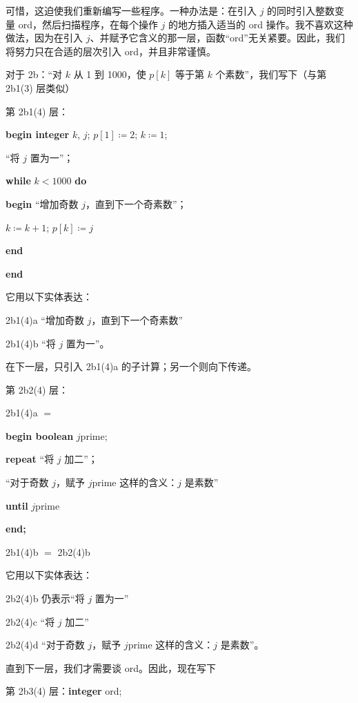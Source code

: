 可惜，这迫使我们重新编写一些程序。一种办法是：在引入 $j$ 的同时引入整数变量 ord，然后扫描程序，在每个操作 $j$ 的地方插入适当的 ord 操作。我不喜欢这种做法，因为在引入 $j$、并赋予它含义的那一层，函数“ord”无关紧要。因此，我们将努力只在合适的层次引入 ord，并且非常谨慎。

对于 2b：“对 $k$ 从 1 到 1000，使 $p[k]$ 等于第 $k$ 个素数”，我们写下（与第 2b1(3) 层类似）

\noindent
第 2b1(4) 层：

\noindent
\textbf{begin integer} $k$, $j$; $p[1] \coloneq 2$; $k \coloneq 1$;

\noindent
\quad “将 $j$ 置为一”；

\noindent
\quad\textbf{while} $k < 1000$ \textbf{do}

\noindent
\quad\textbf{begin} “增加奇数 $j$，直到下一个奇素数”；

\noindent
\quad\quad $k \coloneq k + 1$; $p[k] \coloneq j$

\noindent
\quad\textbf{end}

\noindent
\textbf{end}

\noindent
它用以下实体表达：

\noindent
2b1(4)a\tabto{5em} “增加奇数 $j$，直到下一个奇素数”

\noindent
2b1(4)b\tabto{5em} “将 $j$ 置为一”。

在下一层，只引入 2b1(4)a 的子计算；另一个则向下传递。

\noindent
第 2b2(4) 层：

\noindent
2b1(4)a $=$

\noindent
\textbf{begin boolean} $j$prime;

\noindent
\quad\textbf{repeat} “将 $j$ 加二”；

\noindent
\quad\quad “对于奇数 $j$，赋予 $j$prime 这样的含义：$j$ 是素数”

\noindent
\quad\textbf{until} $j$prime

\noindent
\textbf{end;}

\noindent
2b1(4)b $=$ 2b2(4)b

\noindent
它用以下实体表达：

\noindent
2b2(4)b\tabto{5em} 仍表示“将 $j$ 置为一”

\noindent
2b2(4)c\tabto{5em} “将 $j$ 加二”

\noindent
2b2(4)d\tabto{5em} “对于奇数 $j$，赋予 $j$prime 这样的含义：$j$ 是素数”。

直到下一层，我们才需要谈 ord。因此，现在写下

\noindent
第 2b3(4) 层：\textbf{integer} ord;

